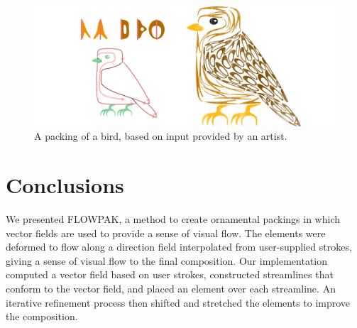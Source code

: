 \begin{figure}
\centering
\includegraphics[width=1.0\textwidth]{figures/flowpak/bird_square.pdf}
\caption[A packing of a bird]
{A packing of a bird, based on input provided by
  an artist.}
\label{bird_square}
\end{figure}


\section{Conclusions}
\label{flowpak_conclusions}

\newtext
{
We presented FLOWPAK, a method to create ornamental packings
in which vector fields are used to provide a sense of visual flow. 
The elements were deformed to flow along a direction field interpolated
from user-supplied strokes, giving a sense of visual flow to the final composition.
Our implementation computed a vector field based on user strokes,
constructed streamlines that conform to the vector field, and placed an
element over each streamline. An iterative refinement process then
shifted and stretched the elements to improve the composition.
}



